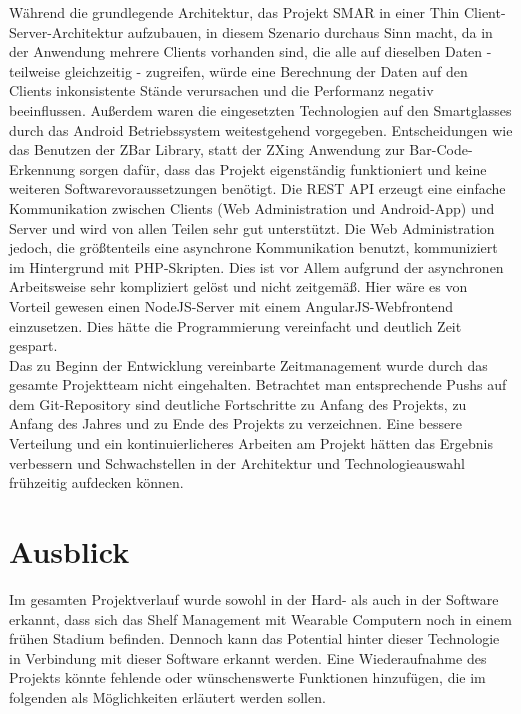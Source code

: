 Während die grundlegende Architektur, das Projekt \ac{SMAR} in einer Thin Client-Server-Architektur aufzubauen, in diesem Szenario durchaus Sinn macht, da in der Anwendung mehrere Clients vorhanden sind, die alle auf dieselben Daten - teilweise gleichzeitig - zugreifen, würde eine Berechnung der Daten auf den Clients inkonsistente Stände verursachen und die Performanz negativ beeinflussen. Außerdem waren die eingesetzten Technologien auf den Smartglasses durch das Android Betriebssystem weitestgehend vorgegeben. Entscheidungen wie \zB das Benutzen der ZBar Library, statt der ZXing Anwendung zur Bar-Code-Erkennung sorgen dafür, dass das Projekt eigenständig funktioniert und keine weiteren Softwarevoraussetzungen benötigt. Die \ac{REST} \ac{API} erzeugt eine einfache Kommunikation zwischen Clients (Web Administration und Android-App) und Server und wird von allen Teilen sehr gut unterstützt. Die Web Administration jedoch, die größtenteils eine asynchrone Kommunikation benutzt, kommuniziert im Hintergrund mit PHP-Skripten. Dies ist vor Allem aufgrund der asynchronen Arbeitsweise sehr kompliziert gelöst und nicht zeitgemäß. Hier wäre es von Vorteil gewesen einen NodeJS-Server mit einem AngularJS-Webfrontend einzusetzen. Dies hätte die Programmierung vereinfacht und deutlich Zeit gespart.\\

Das zu Beginn der Entwicklung vereinbarte Zeitmanagement wurde durch das gesamte Projektteam nicht eingehalten. Betrachtet man entsprechende Pushs auf dem Git-Repository sind deutliche Fortschritte zu Anfang des Projekts, zu Anfang des Jahres und zu Ende des Projekts zu verzeichnen. Eine bessere Verteilung und ein kontinuierlicheres Arbeiten am Projekt hätten das Ergebnis verbessern und Schwachstellen in der Architektur und Technologieauswahl frühzeitig aufdecken können.

\chapter{Ausblick}
\label{cha:ausblick}
Im gesamten Projektverlauf wurde sowohl in der Hard- als auch in der Software erkannt, dass sich das Shelf Management mit Wearable Computern noch in einem frühen Stadium befinden. Dennoch kann das Potential hinter dieser Technologie in Verbindung mit dieser Software erkannt werden. Eine Wiederaufnahme des Projekts könnte fehlende oder wünschenswerte Funktionen hinzufügen, die im folgenden als Möglichkeiten erläutert werden sollen.\\

